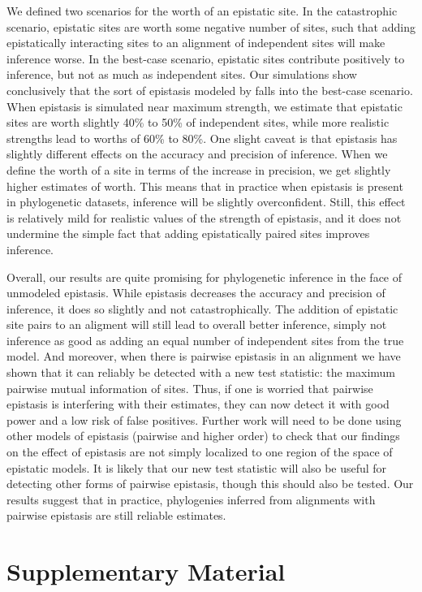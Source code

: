 \documentclass[11pt]{article}
\begin{document}
We defined two scenarios for the worth of an epistatic site.
In the catastrophic scenario, epistatic sites are worth some negative number of sites, such that adding epistatically interacting sites to an alignment of independent sites will make inference worse.
In the best-case scenario, epistatic sites contribute positively to inference, but not as much as independent sites.
Our simulations show conclusively that the sort of epistasis modeled by \citet{nasrallah2013phylogenetic} falls into the best-case scenario.
When epistasis is simulated near maximum strength, we estimate that epistatic sites are worth slightly 40\% to 50\% of independent sites, while more realistic strengths lead to worths of 60\% to 80\%.
One slight caveat is that epistasis has slightly different effects on the accuracy and precision of inference.
When we define the worth of a site in terms of the increase in precision, we get slightly higher estimates of worth.
This means that in practice when epistasis is present in phylogenetic datasets, inference will be slightly overconfident.
Still, this effect is relatively mild for realistic values of the strength of epistasis, and it does not undermine the simple fact that adding epistatically paired sites improves inference.

Overall, our results are quite promising for phylogenetic inference in the face of unmodeled epistasis.
While epistasis decreases the accuracy and precision of inference, it does so slightly and not catastrophically.
The addition of epistatic site pairs to an aligment will still lead to overall better inference, simply not inference as good as adding an equal number of independent sites from the true model.
And moreover, when there is pairwise epistasis in an alignment we have shown that it can reliably be detected with a new test statistic: the maximum pairwise mutual information of sites.
Thus, if one is worried that pairwise epistasis is interfering with their estimates, they can now detect it with good power and a low risk of false positives.
Further work will need to be done using other models of epistasis (pairwise and higher order) to check that our findings on the effect of epistasis are not simply localized to one region of the space of epistatic models.
It is likely that our new test statistic will also be useful for detecting other forms of pairwise epistasis, though this should also be tested.
Our results suggest that in practice, phylogenies inferred from alignments with pairwise epistasis are still reliable estimates.

\section*{Supplementary Material}
\end{document}
